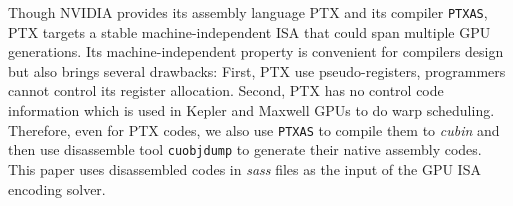 Though NVIDIA provides its assembly language PTX and its compiler {\tt PTXAS}, PTX targets a stable machine-independent ISA that could span multiple GPU generations.
Its machine-independent property is convenient for compilers design but also brings several drawbacks:
First, PTX use pseudo-registers, programmers cannot control its register allocation. 
Second, PTX has no control code information which is used in Kepler and Maxwell GPUs to do warp scheduling.
Therefore, even for PTX codes, we also use {\tt PTXAS} to compile them to \emph{cubin} and then use disassemble tool {\tt cuobjdump} to generate their native assembly codes. 
This paper uses disassembled codes in {\em sass} files as the input of the GPU ISA encoding solver.
